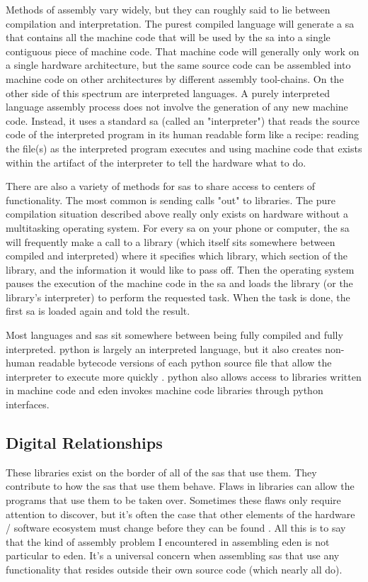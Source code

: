 \documentclass[a4paper,man,natbib,floatsintext]{apa6}
\begin{document}
   Methods of assembly vary widely, but they can roughly said to lie between compilation and interpretation. The purest compiled language will generate a \gls{sa} that contains all the machine code that will be used by the \gls{sa} into a single contiguous piece of machine code. That machine code will generally only work on a single hardware architecture, but the same source code can be assembled into machine code on other architectures by different assembly tool-chains. On the other side of this spectrum are interpreted languages. A purely interpreted language assembly process does not involve the generation of any new machine code. Instead, it uses a standard \gls{sa} (called an "interpreter") that reads the source code of the interpreted program in its human readable form like a recipe: reading the file(s) as the interpreted program executes and using machine code that exists within the artifact of the interpreter to tell the hardware what to do.

   There are also a variety of methods for \glspl{sa} to share access to centers of functionality. The most common is sending calls "out" to libraries. The pure compilation situation described above really only exists on hardware without a multitasking operating system. For every \gls{sa} on your phone or computer, the \gls{sa} will frequently make a call to a library (which itself sits somewhere between compiled and interpreted) where it specifies which library, which section of the library, and the information it would like to pass off. Then the operating system pauses the execution of the machine code in the \gls{sa} and loads the library (or the library's interpreter) to perform the requested task. When the task is done, the first \gls{sa} is loaded again and told the result. 

   Most languages and \glspl{sa} sit somewhere between being fully compiled and fully interpreted. \Gls{python} is largely an interpreted language, but it also creates non-human readable bytecode versions of each python source file that allow the interpreter to execute more quickly \citep{The_Python_Software_Foundation2020-qz}. \Gls{python} also allows access to libraries written in machine code and \acrshort{eden} invokes machine code libraries through \gls{python} interfaces.

   \subsection{Digital Relationships}
   These libraries exist on the border of all of the \glspl{sa} that use them. They contribute to how the \glspl{sa} that use them behave. Flaws in libraries can allow the programs that use them to be taken over. Sometimes these flaws only require attention to discover, but it's often the case that other elements of the hardware / software ecosystem must change before they can be found \citep{Huang2003-ki}. All this is to say that the kind of assembly problem I encountered in assembling \acrshort{eden} is not particular to \acrshort{eden}. It's a universal concern when assembling \glspl{sa} that use any functionality that resides outside their own source code (which nearly all do).
\end{document}
